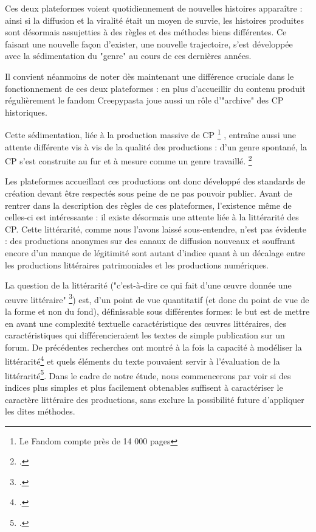 \documentclass[12pt,a4paper,oneside,titlepage]{book} %
\begin{document}
	Ces deux plateformes voient  quotidiennement de nouvelles histoires apparaître : ainsi si la diffusion et la viralité était un moyen de survie, les histoires produites sont désormais assujetties à des règles et des méthodes biens différentes. Ce faisant une nouvelle façon d'exister, une nouvelle trajectoire, s'est développée avec la sédimentation du "genre" au cours de ces dernières années. 
	
	Il convient néanmoins de noter dès maintenant une différence cruciale dans le fonctionnement de ces deux plateformes : en plus d'accueillir du contenu produit régulièrement le fandom Creepypasta joue aussi un rôle d'"archive" des CP historiques. 
	
	Cette sédimentation, liée à la production massive de CP \footnote{Le Fandom compte près de 14 000 pages} , entraîne aussi une attente différente vis à vis de la qualité des productions : d'un genre spontané, la CP s'est construite au fur et à mesure comme un genre travaillé. \footcite{garcia_roca_creepypasta_2021}
	
	Les plateformes accueillant ces productions ont donc développé des standards de création devant être respectés sous peine de ne pas pouvoir publier. 
	Avant de rentrer dans la description des règles de ces plateformes, l'existence même de celles-ci est intéressante : il existe désormais une attente liée à la littérarité des CP. Cette littérarité, comme nous l'avons laissé sous-entendre, n'est pas évidente : des productions anonymes sur des canaux de diffusion nouveaux et souffrant encore d'un manque de légitimité sont autant d'indice quant à un décalage entre les productions littéraires patrimoniales et les productions numériques.
	
	La question de la littérarité ("c'est-à-dire ce qui fait d'une œuvre donnée une œuvre littéraire" \footcite{aron_litterature_1984}) est, d'un point de vue quantitatif (et donc du point de vue de la forme et non du fond), définissable sous différentes formes: le but est de mettre en avant une complexité textuelle caractéristique des œuvres littéraires, des caractéristiques qui différencieraient les textes de simple publication sur un forum.
	De précédentes recherches ont montré à la fois la capacité à modéliser la littérarité\footcite{koolen_literary_2020} et quels éléments du texte pouvaient servir à l'évaluation de la littérarité\footcite{van_cranenburgh_identifying_2015}. Dans le cadre de notre étude, nous commencerons par voir si des indices plus simples et plus facilement obtenables suffisent à caractériser le caractère littéraire des productions, sans exclure la possibilité future d'appliquer les dites méthodes.
\end{document}
